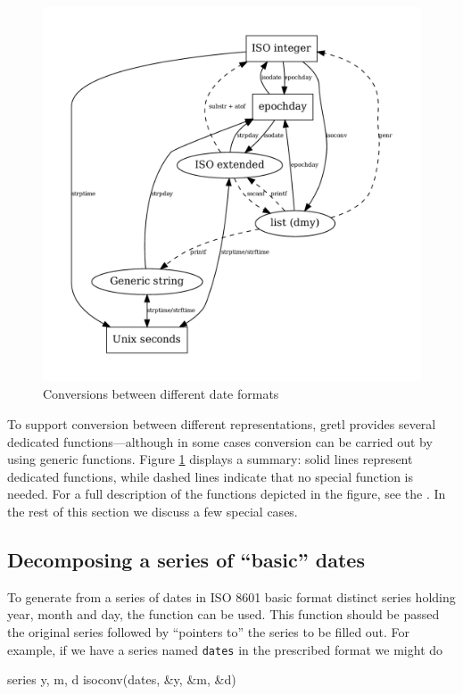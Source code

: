 \begin{figure}[htbp]
  \centering
  \includegraphics[scale=0.667]{figures/date-conversion}
  \caption{Conversions between different date formats}
  \label{fig:cal-conversions}
\end{figure}

To support conversion between different representations, gretl
provides several dedicated functions---although in some cases
conversion can be carried out by using generic functions. Figure
\ref{fig:cal-conversions} displays a summary: solid lines represent
dedicated functions, while dashed lines indicate that no special
function is needed. For a full description of the functions depicted
in the figure, see the \GCR. In the rest of this section we discuss a
few special cases.

\subsection{Decomposing a series of ``basic'' dates}

To generate from a series of dates in ISO 8601 basic format distinct
series holding year, month and day, the function  can be
used. This function should be passed the original series followed by
``pointers to'' the series to be filled out. For example, if we have a
series named \texttt{dates} in the prescribed format we might do
%
\begin{code}
series y, m, d
isoconv(dates, &y, &m, &d)
\end{code}

